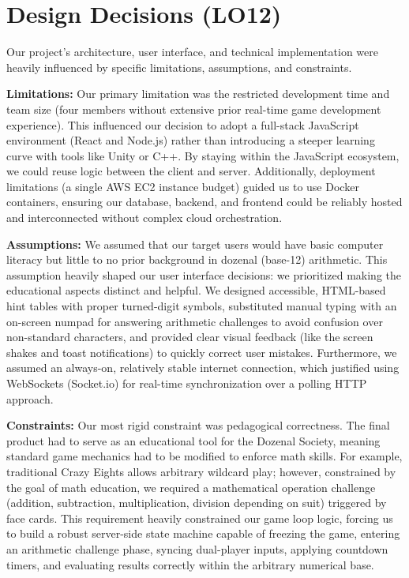 \documentclass{article}
\begin{document}
\section{Design Decisions (LO12)}

Our project's architecture, user interface, and technical implementation were heavily influenced by specific limitations, assumptions, and constraints. 

\textbf{Limitations:}
Our primary limitation was the restricted development time and team size (four members without extensive prior real-time game development experience). This influenced our decision to adopt a full-stack JavaScript environment (React and Node.js) rather than introducing a steeper learning curve with tools like Unity or C++. By staying within the JavaScript ecosystem, we could reuse logic between the client and server. Additionally, deployment limitations (a single AWS EC2 instance budget) guided us to use Docker containers, ensuring our database, backend, and frontend could be reliably hosted and interconnected without complex cloud orchestration.

\textbf{Assumptions:}
We assumed that our target users would have basic computer literacy but little to no prior background in dozenal (base-12) arithmetic. This assumption heavily shaped our user interface decisions: we prioritized making the educational aspects distinct and helpful. We designed accessible, HTML-based hint tables with proper turned-digit symbols, substituted manual typing with an on-screen numpad for answering arithmetic challenges to avoid confusion over non-standard characters, and provided clear visual feedback (like the screen shakes and toast notifications) to quickly correct user mistakes. Furthermore, we assumed an always-on, relatively stable internet connection, which justified using WebSockets (Socket.io) for real-time synchronization over a polling HTTP approach.

\textbf{Constraints:}
Our most rigid constraint was pedagogical correctness. The final product had to serve as an educational tool for the Dozenal Society, meaning standard game mechanics had to be modified to enforce math skills. For example, traditional Crazy Eights allows arbitrary wildcard play; however, constrained by the goal of math education, we required a mathematical operation challenge (addition, subtraction, multiplication, division depending on suit) triggered by face cards. This requirement heavily constrained our game loop logic, forcing us to build a robust server-side state machine capable of freezing the game, entering an arithmetic challenge phase, syncing dual-player inputs, applying countdown timers, and evaluating results correctly within the arbitrary numerical base.
\end{document}
